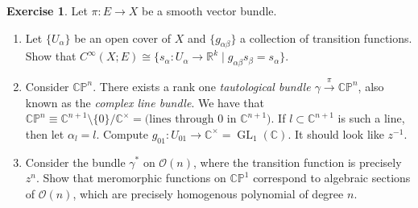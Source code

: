 \documentclass[10pt,letterpaper,cm]{nupset}
\theoremstyle{definition}
\theoremstyle{theorem}
\newtheorem{exercise}[definition]{Exercise}
\theoremstyle{remark}
\newcommand{\C}{\mathbb C}
\newcommand{\CP}{\mathbb{CP}}
\newcommand{\R}{\mathbb{R}}
\newcommand{\1}{\mathbb{1}}
\newcommand{\0}{\vec 0}
\DeclareMathOperator{\GL}{GL}
\begin{document}
\begin{exercise} Let $\pi: E \to X$ be a smooth vector bundle.
\begin{enumerate}
\item  Let $\{U_{\alpha}\}$ be an open cover of $X$ and $\{g_{\alpha{\beta}}\}$  a collection of transition functions. Show that $C^{\infty}(X; E) \cong \{ s_{\alpha} : U_{\alpha} \to \R^k \mid g_{\alpha{\beta}} s_{\beta} = s_{\alpha}\}$.
\item Consider $\CP^n$. There exists a rank one \textit{tautological bundle $ \gamma \overset{\pi}{\longrightarrow} \CP^n$}, also known as the \textit{complex line bundle}. We have that $\CP^n \equiv \C^{n+1}\setminus \{0\} /\C^{\times} = \text{(lines through 0 in } \C^{n+1}\text{)}$. If $l \subset \C^{n+1}$ is such a line, then let $\alpha_l = l$. Compute $g_{01} : U_{01} \to \C^{\times} = \GL_1(\C)$. It should look like $z^{-1}$.
\item Consider the bundle $\gamma^{\ast}$ on $\mathcal{O}(n)$, where the transition function is precisely $z^n$. Show that meromorphic functions on $\CP^1$ correspond to algebraic sections of $\mathcal{O}(n)$, which are precisely homogenous polynomial of degree $n$.
\end{enumerate}
\end{exercise}
\end{document}
